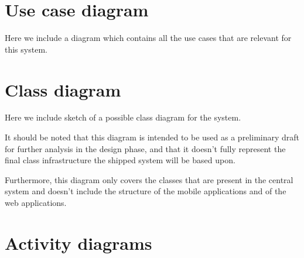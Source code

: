 \section{Use case diagram}
Here we include a diagram which contains all the use cases that are relevant for this system.
\begin{landscape}

\end{landscape}


\section{Class diagram}
Here we include sketch of a possible class diagram for the system. 

It should be noted that this diagram is intended to be used as a preliminary draft for further analysis in the design phase, and that it doesn’t fully represent the final class infrastructure the shipped system will be based upon.

Furthermore, this diagram only covers the classes that are present in the central system and doesn’t include the structure of the mobile applications and of the web applications.

\begin{landscape}
%

\end{landscape}


\section{Activity diagrams}
